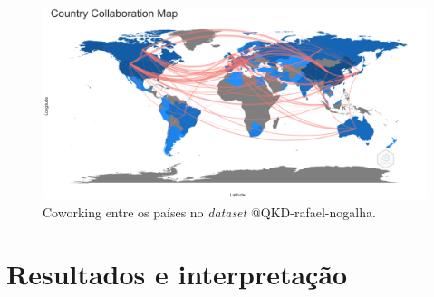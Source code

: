 \begin{figure}[H]
    \centering
    \includegraphics[width=1\textwidth]{experiments/rafaelnogalha/PesquisaBibliografica/QKDSegurancaComputacional/images/country-collaboration-map.png}
    \caption{Coworking entre os países no \textit{dataset} @QKD-rafael-nogalha.}
    \label{fig:cowrking:prod:@QKD-rafael-nogalha}
\end{figure}



\section{Resultados e interpretação}